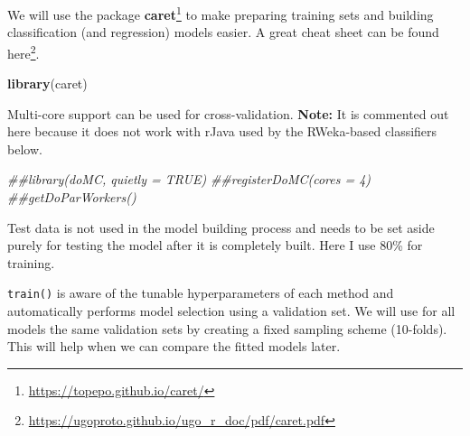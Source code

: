 \documentclass[
  notitlepage]{book}
\newenvironment{Shaded}{\begin{snugshade}}{\end{snugshade}}
\newcommand{\CommentTok}[1]{\textcolor[rgb]{0.56,0.35,0.01}{\textit{#1}}}
\newcommand{\DataTypeTok}[1]{\textcolor[rgb]{0.13,0.29,0.53}{#1}}
\newcommand{\DecValTok}[1]{\textcolor[rgb]{0.00,0.00,0.81}{#1}}
\newcommand{\ErrorTok}[1]{\textcolor[rgb]{0.64,0.00,0.00}{\textbf{#1}}}
\newcommand{\FloatTok}[1]{\textcolor[rgb]{0.00,0.00,0.81}{#1}}
\newcommand{\KeywordTok}[1]{\textcolor[rgb]{0.13,0.29,0.53}{\textbf{#1}}}
\newcommand{\NormalTok}[1]{#1}
\newcommand{\OperatorTok}[1]{\textcolor[rgb]{0.81,0.36,0.00}{\textbf{#1}}}
\newcommand{\StringTok}[1]{\textcolor[rgb]{0.31,0.60,0.02}{#1}}
\DeclareRobustCommand{\href}[2]{#2\footnote{\url{#1}}}
\begin{document}
We will use the package \href{https://topepo.github.io/caret/}{\textbf{caret}} to
make preparing training sets and building classification (and
regression) models easier. A great cheat sheet can be found
\href{https://ugoproto.github.io/ugo_r_doc/pdf/caret.pdf}{here}.

\begin{Shaded}
\begin{Highlighting}[]
\KeywordTok{library}\NormalTok{(caret)}
\end{Highlighting}
\end{Shaded}

Multi-core support can be used for cross-validation. \textbf{Note:} It is
commented out here because it does not work with rJava used by the RWeka-based
classifiers
below.

\begin{Shaded}
\begin{Highlighting}[]
\CommentTok{\#\#library(doMC, quietly = TRUE)}
\CommentTok{\#\#registerDoMC(cores = 4)}
\CommentTok{\#\#getDoParWorkers()}
\end{Highlighting}
\end{Shaded}

Test data is not used in the model building process and needs to be set
aside purely for testing the model after it is completely built. Here I
use 80\% for training.

\begin{Shaded}
\end{Shaded}

\texttt{train()} is aware of the tunable hyperparameters of each method and
automatically performs model selection using a validation set.
We will use for all models the same validation sets by
creating a fixed sampling scheme (10-folds). This will help when we can compare the fitted models later.
\end{document}
